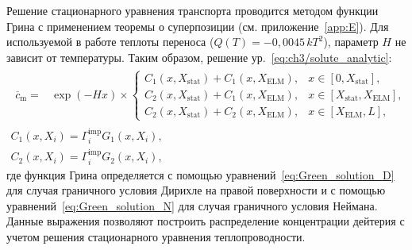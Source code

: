 Решение стационарного уравнения транспорта проводится методом функции Грина с применением теоремы о суперпозиции (см. приложение~\cref{app:E}). Для используемой в работе теплоты переноса ($Q(T)=-0,0045\,kT^2$), параметр $H$ не зависит от температуры. Таким образом, решение ур.~\cref{eq:ch3/solute_analytic}:
\begin{subequations}
	\begin{gather}
	\label{eq:ss_solution}
	\begin{array}{ll}
		\overline{c}_{\mathrm{m}}=&\exp\left(-Hx\right)\times
			\begin{cases}
			C_1(x,X_{\mathrm{stat}})+C_1(x,X_{\mathrm{ELM}}), & x \in [0,X_{\mathrm{stat}}],\\
			C_2(x,X_{\mathrm{stat}})+C_1(x,X_{\mathrm{ELM}}), & x \in [X_{\mathrm{stat}},X_{\mathrm{ELM}}],\\
			C_2(x,X_{\mathrm{stat}})+C_2(x,X_{\mathrm{ELM}}), & x\in [X_{\mathrm{ELM}}, L],
			\end{cases}
	\end{array}\\
	C_1(x,X_i)=\Gamma_i^{\mathrm{imp}}G_1(x,X_i),\\
	C_2(x,X_i)=\Gamma_i^{\mathrm{imp}}G_2(x,X_i),
	\end{gather}
\end{subequations}
где функция Грина определяется с помощью уравнений~\cref{eq:Green_solution_D} для случая граничного условия Дирихле на правой поверхности и с помощью уравнений~\cref{eq:Green_solution_N} для случая граничного условия Неймана. Данные выражения позволяют построить распределение концентрации дейтерия с учетом решения стационарного уравнения теплопроводности.

